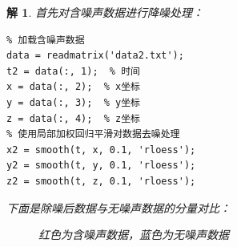 \documentclass[a4paper, 12pt]{ctexart}
\newtheorem*{theorem}{解}
\begin{document}
\begin{theorem}
    首先对含噪声数据进行降噪处理：
\begin{lstlisting}
% 加载含噪声数据
data = readmatrix('data2.txt');
t2 = data(:, 1);  % 时间
x = data(:, 2);  % x坐标
y = data(:, 3);  % y坐标
z = data(:, 4);  % z坐标
% 使用局部加权回归平滑对数据去噪处理
x2 = smooth(t, x, 0.1, 'rloess');  
y2 = smooth(t, y, 0.1, 'rloess');
z2 = smooth(t, z, 0.1, 'rloess');
\end{lstlisting}

\newpage
下面是除噪后数据与无噪声数据的分量对比：
\begin{figure}[h]
    \centering
    \nonumber
    \caption*{红色为含噪声数据，蓝色为无噪声数据}
\end{figure}


\end{theorem}
\end{document}
